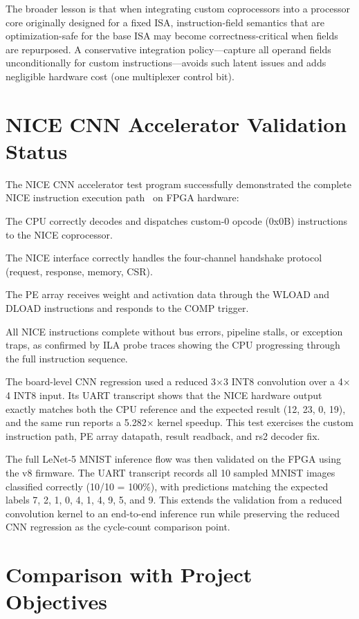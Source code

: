 The broader lesson is that when integrating custom coprocessors into a processor core originally designed for a fixed ISA, instruction-field semantics that are optimization-safe for the base ISA may become correctness-critical when fields are repurposed. A conservative integration policy---capture all operand fields unconditionally for custom instructions---avoids such latent issues and adds negligible hardware cost (one multiplexer control bit).


\section{NICE CNN Accelerator Validation Status}\label{sec:5_2}

The NICE CNN accelerator test program successfully demonstrated the complete NICE instruction execution path~\cite{NUCLEI_NICE} on FPGA hardware:


The CPU correctly decodes and dispatches custom-0 opcode (0x0B) instructions to the NICE coprocessor.


The NICE interface correctly handles the four-channel handshake protocol (request, response, memory, CSR).


The PE array receives weight and activation data through the WLOAD and DLOAD instructions and responds to the COMP trigger.


All NICE instructions complete without bus errors, pipeline stalls, or exception traps, as confirmed by ILA probe traces showing the CPU progressing through the full instruction sequence.


The board-level CNN regression used a reduced 3$\times$3 INT8 convolution over a 4$\times$4 INT8 input. Its UART transcript shows that the NICE hardware output exactly matches both the CPU reference and the expected result (12, 23, 0, 19), and the same run reports a 5.282$\times$ kernel speedup. This test exercises the custom instruction path, PE array datapath, result readback, and rs2 decoder fix.

The full LeNet-5 MNIST inference flow was then validated on the FPGA using the v8 firmware. The UART transcript records all 10 sampled MNIST images classified correctly (10/10 = 100\%), with predictions matching the expected labels 7, 2, 1, 0, 4, 1, 4, 9, 5, and 9. This extends the validation from a reduced convolution kernel to an end-to-end inference run while preserving the reduced CNN regression as the cycle-count comparison point.


\section{Comparison with Project Objectives}\label{sec:5_3}

